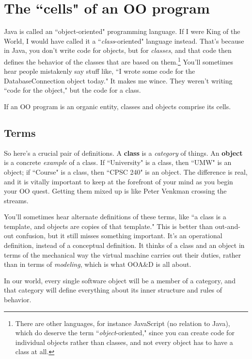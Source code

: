 
\chapter{The ``cells" of an OO program}
\label{ch:cells}


Java is called an ``object-oriented" programming language. If I were King of
the World, I would have called it a ``\textit{class}-oriented" language
instead. That's because in Java, you don't write code for objects, but for
\textit{classes}, and that code then defines the behavior of the classes that
are based on them.\footnote{There are other languages, for instance JavaScript
(no relation to Java), which do deserve the term ``\textit{object}-oriented,"
since you can create code for individual objects rather than classes, and not
every object has to have a class at all.} You'll sometimes hear people
mistakenly say stuff like, ``I wrote some code for the DatabaseConnection
object today." It makes me wince. They weren't writing ``code for the
object," but the code for a class.

If an OO program is an organic entity, classes and objects comprise its cells.

\section{Terms}

So here's a crucial pair of definitions. A \textbf{class} is a
\textit{category} of things. An \textbf{object} is a concrete \textit{example}
of a class. If ``University" is a class, then ``UMW" is an object; if
``Course" is a class, then ``CPSC 240" is an object. The difference is real,
and it is vitally important to keep at the forefront of your mind as you begin
your OO quest. Getting them mixed up is like Peter Venkman crossing the
streams.

You'll sometimes hear alternate definitions of these terms, like ``a class is
a template, and objects are copies of that template." This is better than
out-and-out confusion, but it still misses something important. It's an
operational definition, instead of a conceptual definition. It thinks of a
class and an object in terms of the mechanical way the virtual machine carries
out their duties, rather than in terms of \textit{modeling}, which is what
OOA\&D is all about.

In our world, every single software object will be a member of a category,
and that category will define everything about its inner structure and rules
of behavior.

